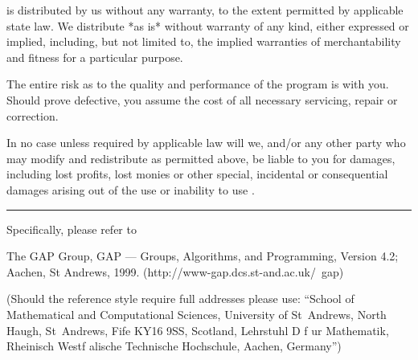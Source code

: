 {\GAP} is distributed by us without any warranty, to the extent permitted
by applicable state law.  We  distribute {\GAP} *as is* without  warranty
of any kind, either expressed or implied, including,  but not limited to,
the implied  warranties  of merchantability and  fitness for a particular
purpose.

The entire risk as to the quality and performance of the program is  with
you.  Should {\GAP} prove defective, you assume the cost of all necessary
servicing, repair or correction.

In no  case  unless  required by applicable law will we, and/or any other
party who  may  modify  and  redistribute  {\GAP}  as permitted above, be
liable  to you for damages, including lost profits, lost monies or  other
special, incidental or consequential damages  arising out  of the  use or
inability to use {\GAP}.

\hrule

Specifically, please refer to

\begintt
[GAP 00] The GAP Group, GAP --- Groups, Algorithms, and Programming,
         Version 4.2; Aachen, St Andrews, 1999.
         (http://www-gap.dcs.st-and.ac.uk/~gap)
\endtt

(Should the reference style require full addresses please use:
``School of Mathematical and Computational Sciences,
University of St~Andrews,
North Haugh, St~Andrews, Fife KY16 9SS, Scotland,
Lehrstuhl D f{ u}r Mathematik,
Rheinisch Westf{ a}lische Technische Hochschule, Aachen,
Germany'')

